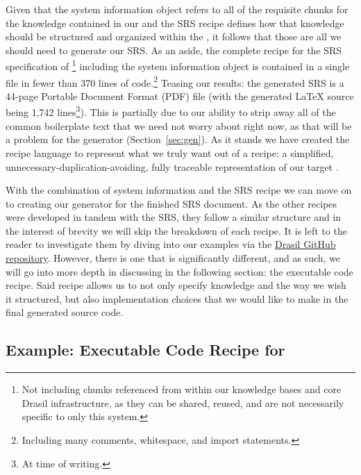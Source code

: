 
Given that the system information object refers to all of the requisite chunks 
for the knowledge contained in our \sfs{} and the SRS recipe defines how that 
knowledge should be structured and organized within the \sf{}, it follows that 
those are all we should need to generate our SRS. As an aside, the complete 
recipe for the SRS specification of \gb{}\footnote{Not including chunks 
referenced from within our knowledge bases and core Drasil infrastructure,
as they can be shared, reused, and are not necessarily specific to only this 
system.} including the system information object is contained in a single file
in fewer than 370 lines of code.\footnote{Including many comments, whitespace,
and import statements.} Teasing our results: the generated SRS is a 44-page
Portable Document Format (PDF) file (with the generated \LaTeX{} source being
1,742 lines\footnote{At time of writing.}). This is partially due to our
ability to strip away all of the common boilerplate text that we need not worry
about right now, as that will be a problem for the generator
(Section~\ref{sec:gen}).
As it stands we have created the recipe language to represent what we truly 
want out of a recipe: a simplified, unnecessary-duplication-avoiding, fully 
traceable representation of our target \sf{}.

With the combination of system information and the SRS recipe we can move
on to creating our generator for the finished SRS document. As the other \sf{} 
recipes were developed in tandem with the SRS, they follow a similar structure 
and in the interest of brevity we will skip the breakdown of each recipe. It is 
left to the reader to investigate them by diving into our examples via the 
\href{https://github.com/jacquescarette/drasil}{Drasil GitHub repository}. 
However, there is one \sf{} that is significantly
different, and
as such, we will go into more depth in discussing in the following section: the 
executable code recipe. Said recipe allows us to not only specify knowledge and 
the way we wish it structured, but also implementation choices that we would 
like to make in the final generated source code.

\subsection{Example: Executable Code Recipe for \gb{}}
\label{sec:gbCodeRecipe}

